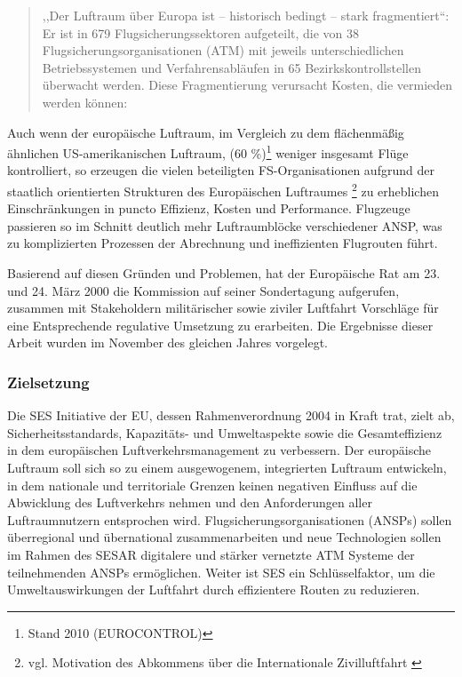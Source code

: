 
    \begin{quote}
        ,,Der Luftraum über Europa ist – historisch bedingt – stark fragmentiert``:  Er ist in 679 Flugsicherungssektoren aufgeteilt, die von 38 Flugsicherungsorganisationen (ATM) mit jeweils unterschiedlichen
        Betriebssystemen und Verfahrensabläufen in 65 Bezirkskontrollstellen überwacht werden. Diese Fragmentierung verursacht Kosten, die vermieden werden können:
        \cite[S.6]{eu_ses_studie} 
    \end{quote}
        
    \noindent
    Auch wenn der europäische Luftraum, im Vergleich zu dem flächenmäßig ähnlichen US-amerikanischen Luftraum, (60 \%)\footnote{Stand 2010 (EUROCONTROL)} weniger insgesamt Flüge kontrolliert, so erzeugen die vielen beteiligten FS-Organisationen aufgrund der staatlich orientierten Strukturen des Europäischen Luftraumes \footnote{vgl. Motivation des Abkommens über die Internationale Zivilluftfahrt \cite{icao_convention}} zu erheblichen Einschränkungen in puncto Effizienz, Kosten und Performance.
    Flugzeuge passieren so im Schnitt deutlich mehr Luftraumblöcke verschiedener \ac{ANSP}, was zu komplizierten Prozessen der Abrechnung und ineffizienten Flugrouten führt.  
    \cite[S. 74]{eu_ses_fab}

    \medskip
    Basierend auf diesen Gründen und Problemen, hat der Europäische Rat am 23. und 24. März 2000 die Kommission auf seiner Sondertagung aufgerufen, zusammen mit Stakeholdern militärischer sowie ziviler Luftfahrt Vorschläge für eine Entsprechende regulative Umsetzung zu erarbeiten.
    Die Ergebnisse dieser Arbeit wurden im November des gleichen Jahres vorgelegt.
    \cite[ErwG. 2]{2004R0549}
    
\subsubsection{Zielsetzung}

    Die \acf{SES} Initiative der \acf{EU}, dessen Rahmenverordnung 2004 in Kraft trat, zielt ab, Sicherheitsstandards, Ka\-pazitäts- und Umweltaspekte sowie die Gesamteffizienz in dem europäischen Luftverkehrsmanagement zu verbessern.
    Der europäische Luftraum soll sich so zu einem ausgewogenem, integrierten Luftraum entwickeln, in dem nationale und territoriale Grenzen keinen negativen Einfluss auf die Abwicklung des Luftverkehrs nehmen und den Anforderungen aller Luftraumnutzern entsprochen wird. \cite[Art. 1 Abs. 1]{2004R0549}
    Flugsicherungsorganisationen (\acsp{ANSP}) sollen überregional und übernational zusammenarbeiten und neue Technologien sollen im Rahmen des \acf{SESAR} digitalere und stärker vernetzte \acs{ATM} Systeme der teilnehmenden \acp{ANSP} ermöglichen.
    Weiter ist \acs{SES} ein Schlüsselfaktor, um die Umweltauswirkungen der Luftfahrt durch effizientere Routen zu reduzieren.  

